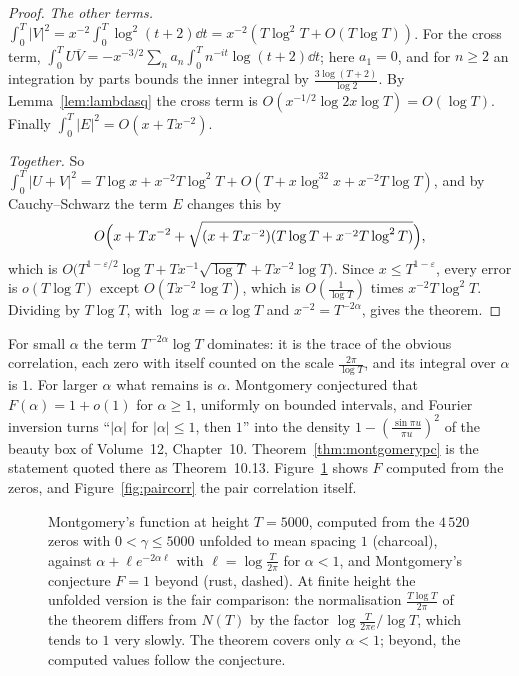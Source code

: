 \begin{proof}
\emph{The other terms.} $\int_0^T|V|^2=x^{-2}\int_0^T\log^2(t+2)\dd t=x^{-2}(T\log^2T+O(T\log T))$. For the cross term, $\int_0^TU\overline V=-x^{-3/2}\sum_na_n\int_0^Tn^{-it}\log(t+2)\dd t$; here $a_1=0$, and for $n\ge2$ an integration by parts bounds the inner integral by $\frac{3\log(T+2)}{\log2}$. By Lemma~\ref{lem:lambdasq} the cross term is $O(x^{-1/2}\log2x\log T)=O(\log T)$. Finally $\int_0^T|E|^2=O(x+Tx^{-2})$.

\emph{Together.} So $\int_0^T|U+V|^2=T\log x+x^{-2}T\log^2T+O(T+x\log^32x+x^{-2}T\log T)$, and by Cauchy--Schwarz the term $E$ changes this by
\[
O\Bigl(x+Tx^{-2}+\sqrt{(x+Tx^{-2})(T\log T+x^{-2}T\log^2T)}\Bigr),
\]
which is $O\bigl(T^{1-\varepsilon/2}\log T+Tx^{-1}\sqrt{\log T}+Tx^{-2}\log T\bigr)$.
Since $x\le T^{1-\varepsilon}$, every error is $o(T\log T)$ except $O(Tx^{-2}\log T)$, which is $O(\frac1{\log T})$ times $x^{-2}T\log^2T$. Dividing by $T\log T$, with $\log x=\alpha\log T$ and $x^{-2}=T^{-2\alpha}$, gives the theorem.
\end{proof}

For small $\alpha$ the term $T^{-2\alpha}\log T$ dominates: it is the trace of the obvious correlation, each zero with itself counted on the scale $\frac{2\pi}{\log T}$, and its integral over $\alpha$ is $1$. For larger $\alpha$ what remains is $\alpha$. Montgomery conjectured that $F(\alpha)=1+o(1)$ for $\alpha\ge1$, uniformly on bounded intervals, and Fourier inversion turns ``$|\alpha|$ for $|\alpha|\le1$, then $1$'' into the density $1-(\frac{\sin\pi u}{\pi u})^2$ of the beauty box of Volume~12, Chapter~10. Theorem~\ref{thm:montgomerypc} is the statement quoted there as Theorem~10.13. Figure~\ref{fig:falpha} shows $F$ computed from the zeros, and Figure~\ref{fig:paircorr} the pair correlation itself.

\begin{figure}[ht]
\centering
{}
\caption{Montgomery's function at height $T=5000$, computed from the $4\,520$ zeros with $0<\gamma\le5000$ unfolded to mean spacing $1$ (charcoal), against $\alpha+\ell e^{-2\alpha\ell}$ with $\ell=\log\frac T{2\pi}$ for $\alpha<1$, and Montgomery's conjecture $F=1$ beyond (rust, dashed). At finite height the unfolded version is the fair comparison: the normalisation $\frac{T\log T}{2\pi}$ of the theorem differs from $N(T)$ by the factor $\log\frac T{2\pi e}/\log T$, which tends to $1$ very slowly. The theorem covers only $\alpha<1$; beyond, the computed values follow the conjecture.}
\label{fig:falpha}
\end{figure}

